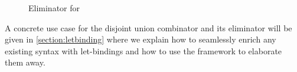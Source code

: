 \begin{figure}[h]
\caption{Eliminator for \label{figure:descsumelim}}
\end{figure}

A concrete use case for the disjoint union combinator and its eliminator
will be given in \cref{section:letbinding} where we explain how to seamlessly
enrich any existing syntax with let-bindings and how to use the 
framework to elaborate them away.






